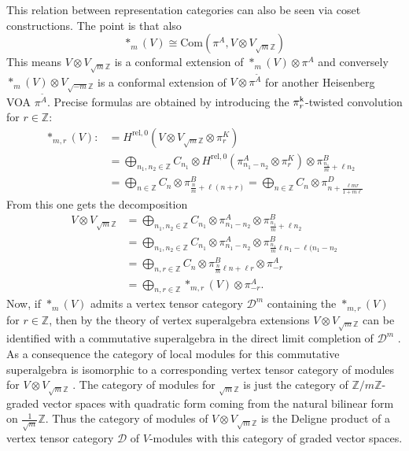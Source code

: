 \documentclass[a4paper, reqno]{amsart}
\theoremstyle{introTheorems}
\newcommand\cD{\mathcal{D}}
\renewcommand{\1}{\mathbbold{1}}
\begin{document}
This relation between representation categories can also be seen via coset constructions. The point is that also \cite{CGNS}
\[
*_m(V) \cong \text{Com}(\pi^A, V \otimes V_{\sqrt{m}\mathbb Z})
\]
This means $V \otimes V_{\sqrt{m}\mathbb Z}$ is a conformal extension of $*_m(V) \otimes \pi^A$ and conversely $*_m(V) \otimes V_{\sqrt{-m}\mathbb Z}$ is a conformal extension of $V \otimes \pi^{\widetilde A}$ for another Heisenberg VOA $\pi^{\widetilde A}$.
Precise formulas are obtained by introducing the $\pi^{\mathsf{k}}_r$-twisted convolution for $r \in \mathbb Z$:
\begin{align*} \nonumber 
     *_{m, r}(V) :&=  H^{\mathrm{rel},0}(V \otimes V_{\sqrt{m}\mathbb Z} \otimes \pi^{K}_r)\\
     &= \bigoplus_{n_1, n_2 \in \mathbb Z} C_{n_1} \otimes H^{\mathrm{rel},0}(\pi^A_{n_1 - n_2} \otimes \pi^{K}_r) \otimes \pi^B_{\frac{n_1}{m} + \ell n_2}\\
     &= \bigoplus_{n\in \mathbb Z} C_{n} \otimes \pi^B_{\frac{n}{m} + \ell (n+r)} \nonumber 
 = \bigoplus_{n\in \mathbb Z} C_{n} \otimes \pi^D_{n + \frac{\ell m  r}{1+m\ell}}  
\end{align*}
From this one gets the decomposition
\begin{align*}
    V \otimes V_{\sqrt{m}\mathbb Z} &= \bigoplus_{n_1, n_2 \in \mathbb Z} C_{n_1} \otimes \pi^A_{n_1-n_2} \otimes \pi^B_{\frac{n_1}{m} +\ell n_2} \\
    &= \bigoplus_{n_1, n_2 \in \mathbb Z} C_{n_1} \otimes \pi^A_{n_1-n_2} \otimes \pi^B_{\frac{n_1}{m} \ell n_1 -\ell (n_1 -n_2} \\ 
    &= \bigoplus_{n, r \in \mathbb Z} C_{n} \otimes \pi^B_{\frac{n}{m} \ell n + \ell r}  \otimes \pi^A_{-r} \\
    &= \bigoplus_{n, r \in \mathbb Z} *_{m, r}(V)  \otimes  \pi^A_{-r}.
\end{align*}
Now, if $*_m(V)$ admits a vertex tensor category $\cD^m$ containing the $*_{m, r}(V)$ for $r \in \mathbb Z$, then by the theory of vertex superalgebra extensions $V \otimes V_{\sqrt{m}\mathbb Z}$ can be identified with a commutative superalgebra in the direct limit completion of $\cD^m$ \cites{HKL, CKL, CMYdirect}. As a consequence the category of local modules for this commutative superalgebra is isomorphic to a corresponding vertex tensor category of modules for $V \otimes V_{\sqrt{m}\mathbb Z}$ \cite{CKM24}. 
The category of modules for $_{\sqrt{m}\mathbb Z}$ is just the category of $\mathbb Z/m\mathbb Z$-graded vector spaces with quadratic form coming from the natural bilinear form on $\frac{1}{\sqrt{m}}\mathbb Z$. Thus the category of modules of $V \otimes V_{\sqrt{m}\mathbb Z}$ is the Deligne product of a vertex tensor category $\cD$ of $V$-modules with this category of graded vector spaces. 
\end{document}
